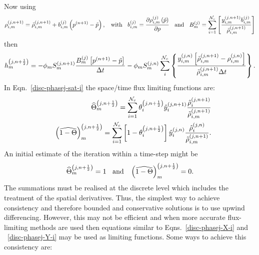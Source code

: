 Now using
\begin{displaymath} 
    \mfr[\rho]{i,m}{j,n+1}=\mfr[\tilde{\rho}]{i,m}{j,n+1}+\mfr[b]{i,m}{j}\left(\mfr[p]{}{n+1}-\tilde{p}\right),\;\;\text{ with }\;\;\mfr[b]{i,m}{j}=\frc{\partial\mfr[\rho]{i,m}{j}\left(\tilde{p}\right)}{\partial p}\;\;\text{ and }\;\; \mfr[B]{m}{j} = \summation_{i=1}^{\mathcal{N}_{c}}\left[\frc{\mfr[y]{i,m}{j,n+1}\mfr[b]{i,m}{j}}{\mfr[\tilde{\rho}]{i,m}{j,n+1}}\right]
\end{displaymath}  
then
\begin{equation}
     \mfr[h]{m}{j, n+\frac{1}{2}} = -\phi_{m} \mfr[S]{m}{j,n+1} \frc{\mfr[B]{m}{j}\left[\mfr[p]{}{n+1}-\tilde{p}\right]}{\Delta t} - \phi_{m} \mfr[S]{m}{j,n} \summation_{i}^{\mathcal{N}_{c}} \left\{\frc{ \mfr[y]{i,m}{j,n} \left[\mfr[\tilde{\rho}]{i,m}{j,n+1} - \mfr[\rho]{i,m}{j,n} \right]}{ \mfr[\tilde{\rho}]{i,m}{j,n+1}\Delta t }\right\}.
\end{equation}
In Eqn.~\ref{disc-phasej-sat-i} the space/time flux limiting functions are: 
     \begin{subequations}
        \begin{align}
           && \mfr[\widehat{\Theta}]{m}{j,n+\frac{1}{2}} = \summation_{i=1}^{\mathcal{N}_{c}}\mfr[\theta]{i}{j,n+\frac{1}{2}}\mfr[\hat{y}]{i}{j,n+1}\frc{\mfr[\hat{\rho}]{i}{j,n+1}}{\mfr[\tilde{\rho}]{i,m}{j,n+1}} \label{disc-phasej-X-i} \\
           && \mfr[\left(\widehat{1-\Theta}\right)]{m}{j,n+\frac{1}{2}} = \summation_{i=1}^{\mathcal{N}_{c}}\left[1-\mfr[\theta]{i}{j,n+\frac{1}{2}}\right]\mfr[\hat{y}]{i}{j,n}\frc{\mfr[\hat{\rho}]{i}{j,n}}{\mfr[\tilde{\rho}]{i,m}{j,n+1}}. \label{disc-phasej-Y-i}
        \end{align}
     \end{subequations}
An initial estimate of the iteration within a time-step might be 
\begin{displaymath}
    \mfr[\widehat{\Theta}]{m}{j,n+\frac{1}{2}}=1\;\;\text{ and }\;\;\mfr[\left(\widehat{1-\Theta}\right)]{m}{j,n+\frac{1}{2}}=0.
\end{displaymath}
The summations must be realised at the discrete level which includes the treatment of the spatial derivatives. Thus, the simplest way to achieve consistency and therefore bounded and conservative solutions is to use upwind differencing. However, this may not be efficient and when more accurate flux-limiting methods are used then equations similar to Eqns.~\ref{disc-phasej-X-i} and ~\ref{disc-phasej-Y-i} may be used as limiting functions. Some ways to achieve this consistency are: 

